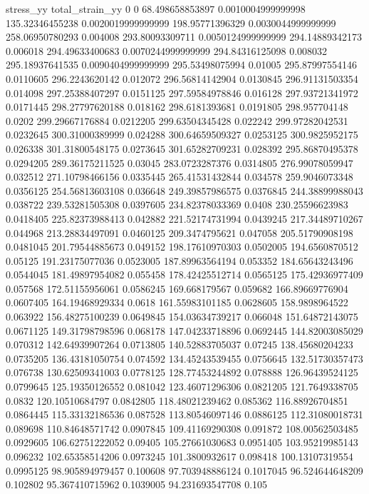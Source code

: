 stress_yy total_strain_yy
0 0
68.498658853897 0.0010004999999998
135.32346455238 0.0020019999999999
198.95771396329 0.0030044999999999
258.06950780293 0.004008
293.80093309711 0.0050124999999999
294.14889342173 0.006018
294.49633400683 0.0070244999999999
294.84316125098 0.008032
295.18937641535 0.0090404999999999
295.53498075994 0.01005
295.87997554146 0.0110605
296.2243620142 0.012072
296.56814142904 0.0130845
296.91131503354 0.014098
297.25388407297 0.0151125
297.59584978846 0.016128
297.93721341972 0.0171445
298.27797620188 0.018162
298.6181393681 0.0191805
298.957704148 0.0202
299.29667176884 0.0212205
299.63504345428 0.022242
299.97282042531 0.0232645
300.31000389999 0.024288
300.64659509327 0.0253125
300.9825952175 0.026338
301.31800548175 0.0273645
301.65282709231 0.028392
295.86870495378 0.0294205
289.36175211525 0.03045
283.0723287376 0.0314805
276.99078059947 0.032512
271.10798466156 0.0335445
265.41531432844 0.034578
259.9046073348 0.0356125
254.56813603108 0.036648
249.39857986575 0.0376845
244.38899988043 0.038722
239.53281505308 0.0397605
234.82378033369 0.0408
230.25596623983 0.0418405
225.82373988413 0.042882
221.52174731994 0.0439245
217.34489710267 0.044968
213.28834497091 0.0460125
209.3474795621 0.047058
205.51790908198 0.0481045
201.79544885673 0.049152
198.17610970303 0.0502005
194.6560870512 0.05125
191.23175077036 0.0523005
187.89963564194 0.053352
184.65643243496 0.0544045
181.49897954082 0.055458
178.42425512714 0.0565125
175.42936977409 0.057568
172.51155956061 0.0586245
169.668179567 0.059682
166.89669776904 0.0607405
164.19468929334 0.0618
161.55983101185 0.0628605
158.9898964522 0.063922
156.48275100239 0.0649845
154.03634739217 0.066048
151.64872143075 0.0671125
149.31798798596 0.068178
147.04233718896 0.0692445
144.82003085029 0.070312
142.64939907264 0.0713805
140.52883705037 0.07245
138.45680204233 0.0735205
136.43181050754 0.074592
134.45243539455 0.0756645
132.51730357473 0.076738
130.62509341003 0.0778125
128.77453244892 0.078888
126.96439524125 0.0799645
125.19350126552 0.081042
123.46071296306 0.0821205
121.7649338705 0.0832
120.10510684797 0.0842805
118.48021239462 0.085362
116.88926704851 0.0864445
115.33132186536 0.087528
113.80546097146 0.0886125
112.31080018731 0.089698
110.84648571742 0.0907845
109.41169290308 0.091872
108.00562503485 0.0929605
106.62751222052 0.09405
105.27661030683 0.0951405
103.95219985143 0.096232
102.65358514206 0.0973245
101.3800932617 0.098418
100.13107319554 0.0995125
98.905894979457 0.100608
97.703948886124 0.1017045
96.524644648209 0.102802
95.367410715962 0.1039005
94.231693547708 0.105
